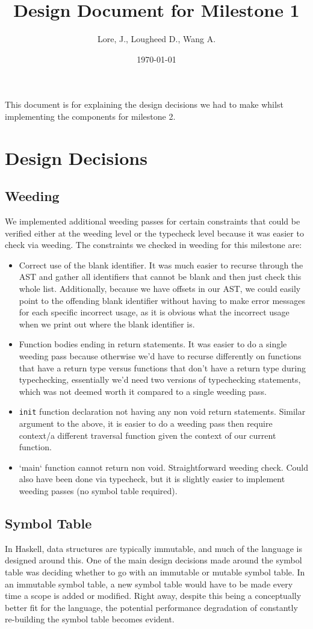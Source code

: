 \documentclass[11pt]{article}
\author{Lore, J., Lougheed D., Wang A.}
\date{\today}
\title{Design Document for Milestone 1}
\begin{document}
\maketitle
\tableofcontents

This document is for explaining the design decisions we had to make
whilst implementing the components for milestone 2.  \newpage
\section{Design Decisions}
\label{sec:org7dd8775}
\subsection{Weeding}
\label{sec:org48d38f9}
We implemented additional weeding passes for certain constraints
that could be verified either at the weeding level or the typecheck
level because it was easier to check via weeding. The constraints
we checked in weeding for this milestone are:
\begin{itemize}
\item Correct use of the blank identifier. It was much easier to recurse
through the AST and gather all identifiers that cannot be blank
and then just check this whole list. Additionally, because we
have offsets in our AST, we could easily point to the offending
blank identifier without having to make error messages for each
specific incorrect usage, as it is obvious what the incorrect
usage when we print out where the blank identifier is.
\item Function bodies ending in return statements. It was easier to do
a single weeding pass because otherwise we'd have to recurse
differently on functions that have a return type versus functions
that don't have a return type during typechecking, essentially
we'd need two versions of typechecking statements, which was not
deemed worth it compared to a single weeding pass.
\item \texttt{init} function declaration not having any non void return
statements. Similar argument to the above, it is easier to do a
weeding pass then require context/a different traversal function
given the context of our current function.
\item `main` function cannot return non void. Straightforward weeding
check. Could also have been done via typecheck, but it is
slightly easier to implement weeding passes (no symbol table
required).
\end{itemize}
\subsection{Symbol Table}
\label{sec:org50fb42e}
In Haskell, data structures are typically immutable, and much of
the language is designed around this. One of the main design
decisions made around the symbol table was deciding whether to go
with an immutable or mutable symbol table. In an immutable symbol
table, a new symbol table would have to be made every time a scope
is added or modified. Right away, despite this being a conceptually
better fit for the language, the potential performance degradation
of constantly re-building the symbol table becomes evident.
\end{document}
